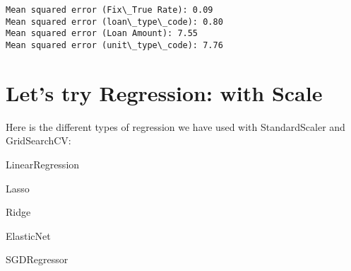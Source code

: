 \documentclass[11pt]{article}
\begin{document}
    \begin{Verbatim}[commandchars=\\\{\}]
Mean squared error (Fix\_True Rate): 0.09
Mean squared error (loan\_type\_code): 0.80
Mean squared error (Loan Amount): 7.55
Mean squared error (unit\_type\_code): 7.76

    \end{Verbatim}

    \section{Let's try Regression: with
Scale}\label{lets-try-regression-with-scale}

Here is the different types of regression we have used with
StandardScaler and GridSearchCV:

LinearRegression

Lasso

Ridge

ElasticNet

SGDRegressor
\end{document}
